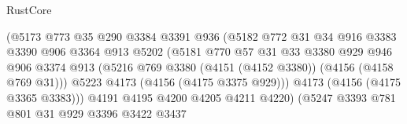 \begin{lexlean}{RustCore}
\begin{coremodule}
                                      (@5173
                                        @773
                                        @35
                                        @290
                                        @3384
                                        @3391
                                        @936
                                        (@5182
                                          @772
                                          @31
                                          @34
                                          @916
                                          @3383
                                          @3390
                                          @906
                                          @3364
                                          @913
                                          @5202
                                          (@5181
                                            @770
                                            @57
                                            @31
                                            @33
                                            @3380
                                            @929
                                            @946
                                            @906
                                            @3374
                                            @913
                                            (@5216
                                              @769
                                              @3380
                                              (@4151 (@4152 @3380))
                                              (@4156 (@4158 @769 @31)))
                                            @5223
                                            @4173
                                            (@4156 (@4175 @3375 @929)))
                                          @4173
                                          (@4156 (@4175 @3365 @3383)))
                                        @4191
                                        @4195
                                        @4200
                                        @4205
                                        @4211
                                        @4220)
                                      (@5247
                                        @3393
                                        @781
                                        @801
                                        @31
                                        @929
                                        @3396
                                        @3422
                                        @3437

\end{coremodule}
\end{lexlean}
